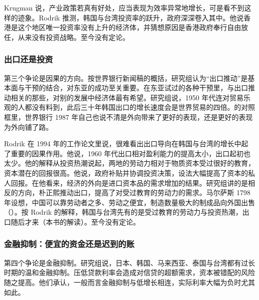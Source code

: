 Krugman 说，产业政策若真有好处，应当表现为效率异常地增长，可是看不到这样的迹象\cite{krugman1994}。Rodrik 推测，韩国与台湾投资率的跃升，政府深深卷入其中\cite{collinsbosworth1996}。他说香港是这个地区唯一投资率没有上升的经济体，并猜想原因是香港政府奉行自由放任，从来没有投资战略\cite{collinsbosworth1996}。至今没有定论。

\subsubsection{出口还是投资}

第三个争论是因果的方向。按世界银行新闻稿的概括，研究组认为“出口推动”是基本面与干预的结合，对东亚的成功至关重要\cite{worldbank1993news}。在东亚试过的各种干预里，与出口推动相关的那些，对别的发展中经济体最有希望\cite{worldbank1993news}。研究组说，1950 年代连对贸易乐观的人都没有料到，此后三十年韩国出口的增长速度会是世界贸易的四倍\cite{worldbank1993}。的对照框里，世界银行 1987 年自己也说不清是外向带来了更好的表现，还是更好的表现为外向铺了路\cite{wdr1987}。

Rodrik 在 1994 年的工作论文里说，很难看出出口导向在韩国与台湾的增长中起了重要的因果作用\cite{rodrik1994}。他说，1960 年代出口相对盈利能力的提高太小，出口起初也太少\cite{rodrik1994}。他的解释从投资热潮说起，两地的劳动力相对于物质资本受过很好的教育，资本潜在的回报很高\cite{rodrik1994}。他说，政府补贴并协调投资决策，设法大幅提高了资本的私人回报\cite{rodrik1994}。在他看来，经济的外向是进口资本品的需求增加的结果\cite{rodrik1994}。研究组讲的是相反的方向，朴正熙推动出口，提高了对受过教育的劳动力的需求\cite{worldbank1993}。马尔萨斯 1798 年设想，中国可以靠劳动者之多、劳动之便宜，制造数量极大的制成品向外国出售（）。按 Rodrik 的解释，韩国与台湾先有的是受过教育的劳动力与投资热潮，出口随后才来（本书的解读）。至今没有定论。

\subsubsection{金融抑制：便宜的资金还是迟到的账}

第四个争论是金融抑制。研究组说，日本、韩国、马来西亚、泰国与台湾都有过长时期的温和金融抑制\cite{worldbank1993}。压低贷款利率会造成对信贷的超额需求，资本被错配的风险随之提高\cite{worldbank1993}。他们承认，一般而言金融抑制与低增长相连，实际利率大幅为负时尤其如此\cite{worldbank1993}。

